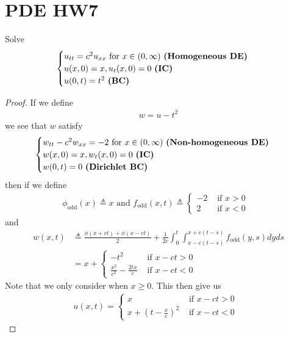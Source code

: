 \documentclass{report}
\begin{document}
\section{PDE HW7}
\begin{question}{}{}
Solve 
\begin{align*}
\begin{cases}
  u_{tt}=c^2u_{xx}\text{ for }x\in (0,\infty)\text{ \textbf{(Homogeneous DE)} } \\
  u(x,0)=x,u_t(x,0)=0\text{ \textbf{(IC)} }\\
  u(0,t)=t^2\text{ \textbf{(BC)} }
\end{cases}
\end{align*}
\end{question}
\begin{proof}
If we define 
\begin{align*}
w=u-t^2
\end{align*}
we see that $w$ satisfy 
\begin{align*}
\begin{cases}
  w_{tt}-c^2w_{xx}=-2\text{ for }x\in (0,\infty)\text{ \textbf{(Non-homogeneous DE)} } \\
  w(x,0)=x,w_t(x,0)=0\text{ \textbf{(IC)} }\\
  w(0,t)=0\text{ \textbf{(Dirichlet BC)} }
\end{cases}
\end{align*}
then if we define 
\begin{align*}
\phi_{\operatorname{odd}}(x)\triangleq x\text{ and }f_{\operatorname{odd}}(x,t)\triangleq \begin{cases}
  -2& \text{ if $x>0$ }\\
  2& \text{ if $x<0$ }
\end{cases} 
\end{align*}
and 
\begin{align*}
  w(x,t)&\triangleq  \frac{\phi (x+ct)+ \phi (x-ct)}{2} + \frac{1}{2c}\int_0^t \int^{x+c(t-s)}_{x-c(t-s)} f_{\operatorname{odd}}(y,s)dyds  \\
  &= x+  \begin{cases}
   -t^2& \text{ if $x-ct>0$ }\\
    \frac{x^2}{c^2}-\frac{2tx}{c}& \text{ if $x-ct<0$ }
  \end{cases}
\end{align*}
Note that we only consider when $x\geq 0$. This then give us 
\begin{align*}
u(x,t)= \begin{cases}
  x &\text{ if $x-ct>0$ }\\
  x+ (t-\frac{x}{c})^2 &\text{ if $x-ct<0$ }
\end{cases}
\end{align*}
\end{proof}
\end{document}
